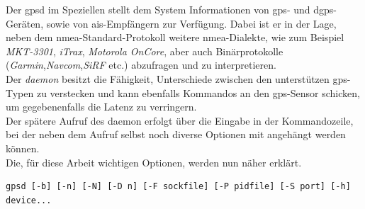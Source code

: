 Der \ac{gpsd} im Speziellen stellt dem System Informationen von \ac{gps}- und \ac{dgps}-Geräten,
sowie von \ac{ais}-Empfängern zur Verfügung.  Dabei ist er in der Lage, neben dem \ac{nmea}-Standard-Protokoll
weitere \ac{nmea}-Dialekte, wie zum Beispiel \emph{MKT-3301}, \emph{iTrax}, \emph{Motorola OnCore},
aber auch Binärprotokolle (\emph{Garmin},\emph{Navcom},\emph{SiRF} etc.) abzufragen und zu
interpretieren. \cite{gpsd}\\
Der \emph{\ac{daemon}} besitzt die Fähigkeit, Unterschiede zwischen den unterstützen \ac{gps}-Typen zu verstecken
und kann ebenfalls Kommandos an den \ac{gps}-Sensor schicken, um gegebenenfalls die Latenz zu verringern. \cite{gpsd}\\

Der spätere Aufruf des \ac{daemon} erfolgt über die Eingabe in der Kommandozeile, bei der neben dem Aufruf
selbst noch diverse Optionen mit angehängt werden können. \cite{gpsd}\\
Die, für diese Arbeit wichtigen Optionen, werden nun näher erklärt.\\

\begin{lstlisting}[caption={Aufruf des \ac{gpsd} in der Kommandozeile},label={code:gpsd}]
  gpsd [-b] [-n] [-N] [-D n] [-F sockfile] [-P pidfile] [-S port] [-h] device...
\end{lstlisting}

